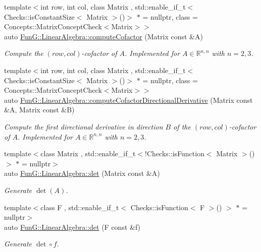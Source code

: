 \begin{DoxyCompactItemize}
\item 
{\footnotesize template$<$int row, int col, class Matrix , std\-::enable\-\_\-if\-\_\-t$<$ Checks\-::is\-Constant\-Size$<$ Matrix $>$()$>$ $\ast$  = nullptr, class  = \-Concepts\-::\-Matrix\-Concept\-Check$<$\-Matrix$>$$>$ }\\auto \hyperlink{group__LinearAlgebraGroup_gace32a0876d4a8333f3bfc564316085ed}{\-Fun\-G\-::\-Linear\-Algebra\-::compute\-Cofactor} (\-Matrix const \&\-A)
\begin{DoxyCompactList}\small\item\em \-Compute the $(row,col)$-\/cofactor of $ A $. \-Implemented for $ A\in \mathbb{R}^{n,n} $ with $ n=2,3 $. \end{DoxyCompactList}\item 
{\footnotesize template$<$int row, int col, class Matrix , std\-::enable\-\_\-if\-\_\-t$<$ Checks\-::is\-Constant\-Size$<$ Matrix $>$()$>$ $\ast$  = nullptr, class  = \-Concepts\-::\-Matrix\-Concept\-Check$<$\-Matrix$>$$>$ }\\auto \hyperlink{group__LinearAlgebraGroup_ga3970ee7fa4d47612427a59cecf56746c}{\-Fun\-G\-::\-Linear\-Algebra\-::compute\-Cofactor\-Directional\-Derivative} (\-Matrix const \&\-A, \-Matrix const \&\-B)
\begin{DoxyCompactList}\small\item\em \-Compute the first directional derivative in direction $ B $ of the $(row,col)$-\/cofactor of $ A $. \-Implemented for $ A\in \mathbb{R}^{n,n} $ with $ n=2,3 $. \end{DoxyCompactList}\item 
{\footnotesize template$<$class Matrix , std\-::enable\-\_\-if\-\_\-t$<$!\-Checks\-::is\-Function$<$ Matrix $>$()$>$ $\ast$  = nullptr$>$ }\\auto \hyperlink{group__LinearAlgebraGroup_gadb3017b4b2828e25a0784b10396a836f}{\-Fun\-G\-::\-Linear\-Algebra\-::det} (\-Matrix const \&\-A)
\begin{DoxyCompactList}\small\item\em \-Generate $\det(A)$. \end{DoxyCompactList}\item 
{\footnotesize template$<$class F , std\-::enable\-\_\-if\-\_\-t$<$ Checks\-::is\-Function$<$ F $>$() $>$ $\ast$  = nullptr$>$ }\\auto \hyperlink{group__LinearAlgebraGroup_ga552048de67f3412ae0a220b3123db6e5}{\-Fun\-G\-::\-Linear\-Algebra\-::det} (\-F const \&f)
\begin{DoxyCompactList}\small\item\em \-Generate $\det\circ f$. \end{DoxyCompactList}\item 

\end{DoxyCompactItemize}
